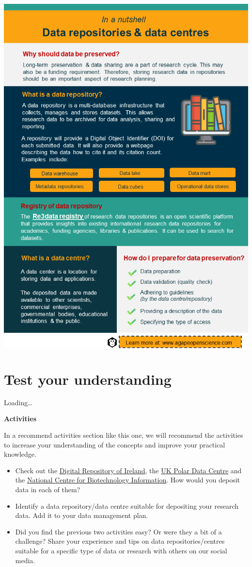 \documentclass[
]{book}
\begin{document}
\begin{center}\includegraphics[width=0.7\linewidth]{images/slide7} \end{center}

\hypertarget{test-your-understanding-5}{%
\section{Test your understanding}\label{test-your-understanding-5}}

Loading\ldots{}

\textbf{Activities}

In a recommend activities section like this one, we will recommend the activities to increase your understanding of the concepts and improve your practical knowledge.

\begin{itemize}
\item
  Check out the \href{https://dri.ie/}{Digital Repository of Ireland}, the \href{https://www.bas.ac.uk/data/uk-pdc/}{UK Polar Data Centre} and the \href{https://www.ncbi.nlm.nih.gov/}{National Centre for Biotechnology Information}. How would you deposit data in each of them?
\item
  Identify a data repository/data centre suitable for depositing your research data. Add it to your data management plan.
\item
  Did you find the previous two activities easy? Or were they a bit of a challenge? Share your experience and tips on data repositories/centres suitable for a specific type of data or research with others on our social media.
\end{itemize}
\end{document}
